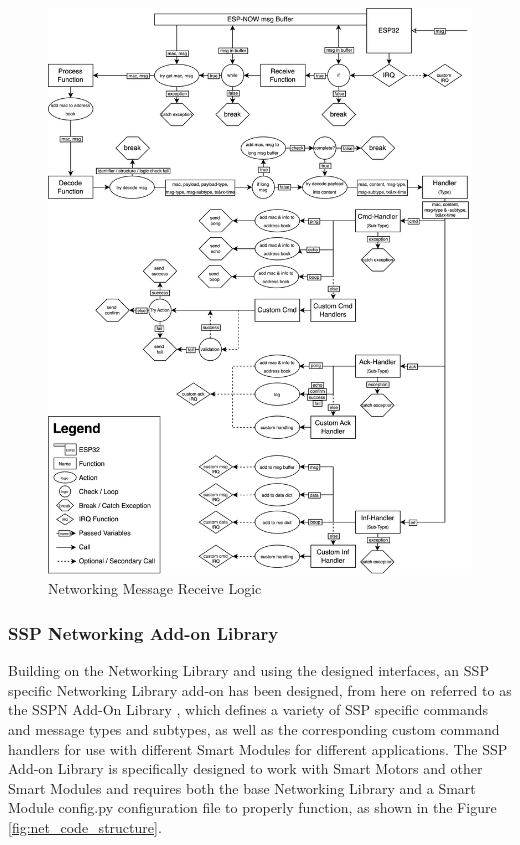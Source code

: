 \begin{figure}[H]
    \centering
    \includegraphics[width=\linewidth]{overleaf/images/receive_logic.drawio.png}
    \vspace{\ftspace}
    \caption{Networking Message Receive Logic}
    \label{fig:net_recv_logic}
\end{figure}


\subsubsection{\label{sec:methods_ssp_networking}SSP Networking Add-on Library}

Building on the Networking Library and using the designed interfaces, an SSP specific Networking Library add-on has been designed, from here on referred to as the SSPN Add-On Library , which defines a variety of SSP specific commands and message types and subtypes, as well as the corresponding custom command handlers for use with different Smart Modules for different applications. The SSP Add-on Library is specifically designed to work with Smart Motors and other Smart Modules and requires both the base Networking Library and a Smart Module config.py configuration file to properly function, as shown in the Figure \ref{fig:net_code_structure}.

